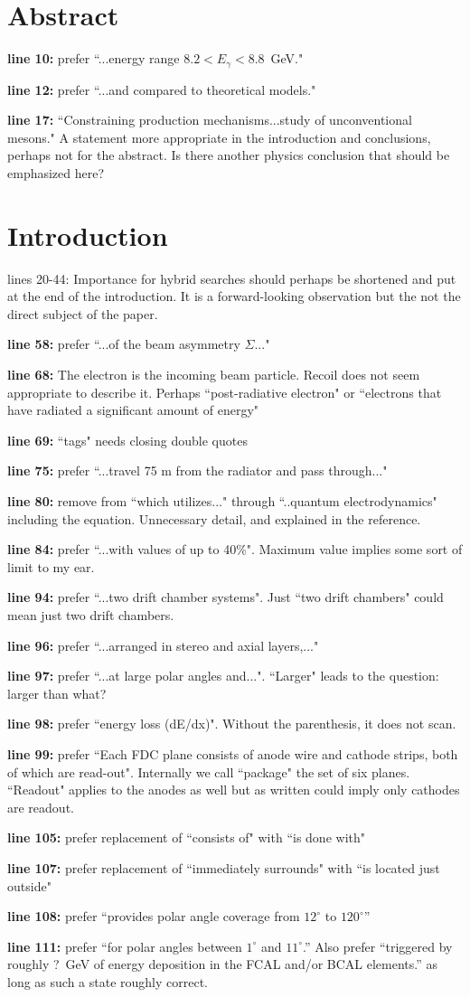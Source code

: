 \documentclass{article}
\newcommand{\itm}[1]{\item{\bf line #1:}}
\begin{document}
\section{Abstract}

\begin{description}
\itm{10} prefer ``...energy range $8.2 < E_\gamma < 8.8$~GeV."
\itm{12} prefer ``...and compared to theoretical  models."
\itm{17} ``Constraining production mechanisms...study of unconventional mesons." A statement more appropriate in the introduction and conclusions, perhaps not for the abstract. Is there another physics conclusion that should be emphasized here?
\end{description}

\section{Introduction}

\begin{description}
\item{lines 20-44:} Importance for hybrid searches should perhaps be shortened and put at the end of the introduction. It is a forward-looking observation but the not the direct subject of the paper.
\itm{58} prefer ``...of the beam asymmetry $\Sigma$..."
\itm{68} The electron is the incoming beam particle. Recoil does not seem appropriate to describe it. Perhaps ``post-radiative electron" or ``electrons that have radiated a significant amount of energy"
\itm{69} ``tags" needs closing double quotes
\itm{75} prefer ``...travel 75 m from the radiator and pass through..."
\itm{80} remove from ``which utilizes..." through ``..quantum electrodynamics" including the equation. Unnecessary detail, and explained in the reference.
\itm{84} prefer ``...with values of up to 40\%". Maximum value implies some sort of limit to my ear.
\itm{94} prefer ``...two drift chamber systems". Just ``two drift chambers" could mean just two drift chambers.
\itm{96} prefer ``...arranged in stereo and axial layers,..."
\itm{97} prefer ``...at large polar angles and...". ``Larger" leads to the question: larger than what?
\itm{98} prefer ``energy loss (dE/dx)". Without the parenthesis, it does not scan.
\itm{99} prefer ``Each FDC plane consists of anode wire and cathode strips, both of which are read-out". Internally we call ``package" the set of six planes. ``Readout" applies to the anodes as well but as written could imply only cathodes are readout.
\itm{105} prefer replacement  of ``consists of" with ``is done with" 
\itm{107} prefer replacement of ``immediately surrounds" with ``is located just outside"
\itm{108} prefer ``provides polar angle coverage from $12^\circ$ to $120^\circ$''
\itm{111} prefer ``for polar angles between $1^\circ$ and $11^\circ$.'' Also prefer ``triggered by roughly ?~GeV of energy deposition in the FCAL and/or BCAL elements.'' as long as such a state roughly correct.
\end{description}
\end{document}
